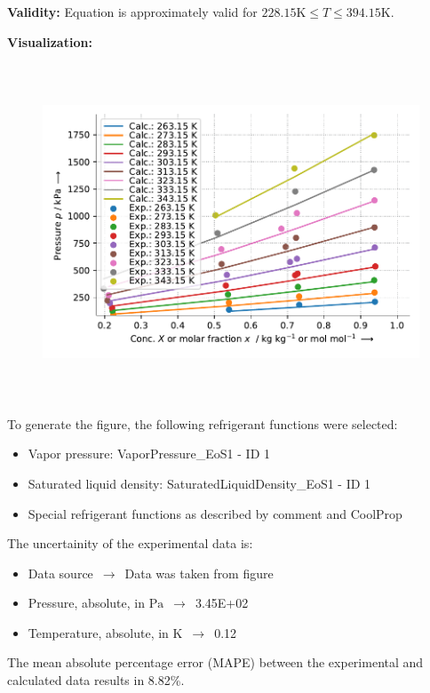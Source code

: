 \textbf{Validity:}
\newline
Equation is approximately valid for $228.15 \si{\kelvin} \leq T \leq 394.15 \si{\kelvin}$.
\newline

\textbf{Visualization:}
%
\begin{figure}[!htp]
{\noindent\includegraphics[height=10cm, keepaspectratio]{figs/abs/abs_R-12_naphthenic__Heil_1.pdf}}
\end{figure}
%

To generate the figure, the following refrigerant functions were selected:
\begin{itemize}
\item Vapor pressure: VaporPressure\_EoS1 - ID 1
\item Saturated liquid density: SaturatedLiquidDensity\_EoS1 - ID 1
\item Special refrigerant functions as described by comment and CoolProp
\end{itemize}

The uncertainity of the experimental data is:
\begin{itemize}
\item Data source $\,\to\,$ Data was taken from figure
\item Pressure, absolute, in $\si{\pascal}$ $\,\to\,$ 3.45E+02
\item Temperature, absolute, in $\si{\kelvin}$ $\,\to\,$ 0.12
\end{itemize}

The mean absolute percentage error (MAPE) between the experimental and calculated data results in 8.82\%.
\FloatBarrier
\newpage
